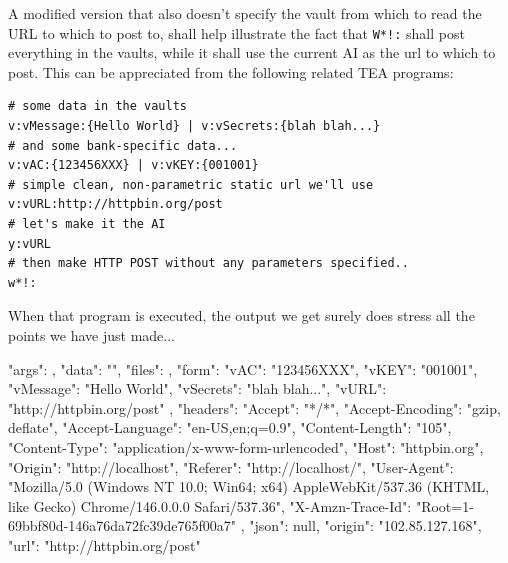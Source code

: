 \documentclass[a4paper, 18pt]{book} %
\begin{document}
{{{  
  
  A modified version that also doesn't specify the vault from which to read the URL to which to post to, shall help illustrate the fact that \texttt{W*!:} shall post everything in the vaults, while it shall use the current AI as the url to which to post. This can be appreciated from the following related TEA programs:
  
  
  \vspace{2em}

  \begin{tcolorbox}[teaterminalstyle, title=W: EXAMPLE 3: A Simple HTTP POST - real - with no explicit parameters, breakable]
  \begin{lstlisting}[language=TEA,breaklines=true,]
# some data in the vaults
v:vMessage:{Hello World} | v:vSecrets:{blah blah...}
# and some bank-specific data...
v:vAC:{123456XXX} | v:vKEY:{001001}
# simple clean, non-parametric static url we'll use
v:vURL:http://httpbin.org/post
# let's make it the AI
y:vURL
# then make HTTP POST without any parameters specified..
w*!:
   \end{lstlisting}
  \end{tcolorbox}

\vspace{1em}
  
  
 When that program is executed, the output we get surely does stress all the points we have just made...
 
 
 \vspace{2em}
 \begin{tcbverbatim}[title=Sample OUTPUT 3 from EXAMPLE 3]
{
  "args": {}, 
  "data": "", 
  "files": {}, 
  "form": {
    "vAC": "123456XXX", 
    "vKEY": "001001", 
    "vMessage": "Hello World", 
    "vSecrets": "blah blah...", 
    "vURL": "http://httpbin.org/post"
  }, 
  "headers": {
    "Accept": "*/*", 
    "Accept-Encoding": "gzip, deflate", 
    "Accept-Language": "en-US,en;q=0.9", 
    "Content-Length": "105", 
    "Content-Type": "application/x-www-form-urlencoded", 
    "Host": "httpbin.org", 
    "Origin": "http://localhost", 
    "Referer": "http://localhost/", 
    "User-Agent": "Mozilla/5.0 (Windows NT 10.0; Win64; x64) AppleWebKit/537.36 (KHTML, like Gecko) Chrome/146.0.0.0 Safari/537.36", 
    "X-Amzn-Trace-Id": "Root=1-69bbf80d-146a76da72fc39de765f00a7"
  }, 
  "json": null, 
  "origin": "102.85.127.168", 
  "url": "http://httpbin.org/post"
}
  \end{tcbverbatim}
 \vspace{2em} 
 
}}}
\end{document}
